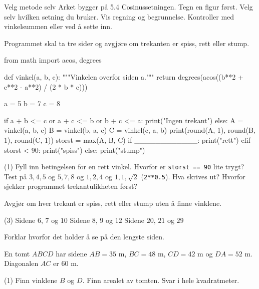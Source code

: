 
\begin{infoboks}{Velg metode selv}
Arket bygger på 5.4 Cosinussetningen. Tegn en figur først. Velg selv hvilken setning du bruker.
Vis regning og begrunnelse. Kontroller med vinkelsummen eller ved å sette inn.
\end{infoboks}


Programmet skal ta tre sider og avgjøre om trekanten er spiss, rett eller stump.
\begin{kode}
from math import acos, degrees

def vinkel(a, b, c):
    """Vinkelen overfor siden a."""
    return degrees(acos((b**2 + c**2 - a**2) / (2 * b * c)))

a = 5
b = 7
c = 8

if a + b <= c or a + c <= b or b + c <= a:
    print("Ingen trekant")
else:
    A = vinkel(a, b, c)
    B = vinkel(b, a, c)
    C = vinkel(c, a, b)
    print(round(A, 1), round(B, 1), round(C, 1))
    storst = max(A, B, C)
    if ____________:
        print("rett")
    elif storst < 90:
        print("spiss")
    else:
        print("stump")
\end{kode}
\begin{tasks}(1)
  \task Fyll inn betingelsen for en rett vinkel. Hvorfor er \lstinline[style=laereverk,numbers=none,frame=none]|storst == 90| lite trygt?
  \task Test på $3, 4, 5$ og $5, 7, 8$ og $1, 2, 4$ og $1, 1, \sqrt2$ (\lstinline[style=laereverk,numbers=none,frame=none]|2**0.5|). Hva skrives ut?
  \task Hvorfor sjekker programmet trekantulikheten først?
\end{tasks}

Avgjør om hver trekant er spiss, rett eller stump uten å finne vinklene.
\begin{tasks}(3)
  \task Sidene $6$, $7$ og $10$
  \task Sidene $8$, $9$ og $12$
  \task Sidene $20$, $21$ og $29$
\end{tasks}
Forklar hvorfor det holder å se på den lengste siden.

En tomt $ABCD$ har sidene $AB = 35$ m, $BC = 48$ m, $CD = 42$ m og $DA = 52$ m. Diagonalen $AC$ er $60$ m.
\begin{tasks}(1)
  \task Finn vinklene $B$ og $D$.
  \task Finn arealet av tomten. Svar i hele kvadratmeter.
\end{tasks}

